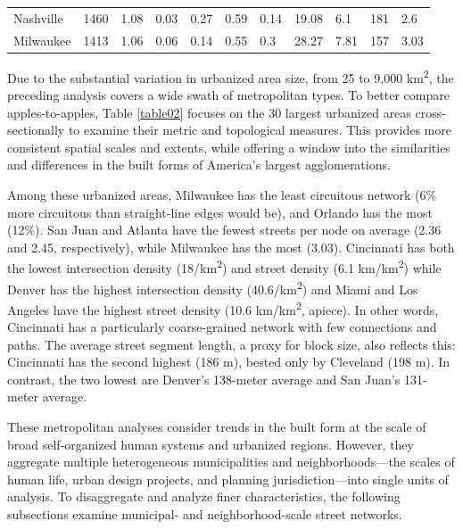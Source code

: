 \documentclass[Afour,sageh,times]{sagej}
\begin{document}
\begin{landscape}
\begin{table}
\begin{tabular}{p{2.5cm} p{1.5cm} p{1.5cm} p{1.5cm} p{1.55cm} p{1.5cm} p{1.5cm} p{1.5cm} p{1.5cm} p{1.5cm} p{1.5cm}}
Nashville            & 1460          & 1.08         & 0.03                       & 0.27           & 0.59        & 0.14        & 19.08                 & 6.1                   & 181                   & 2.6              \\
Milwaukee            & 1413          & 1.06         & 0.06                       & 0.14           & 0.55        & 0.3         & 28.27                 & 7.81                  & 157                   & 3.03 \\
\bottomrule
\end{tabular}
\end{table}
\end{landscape}
\restoregeometry

Due to the substantial variation in urbanized area size, from 25 to 9,000 km\textsuperscript{2}, the preceding analysis covers a wide swath of metropolitan types. To better compare apples-to-apples, Table \ref{table02} focuses on the 30 largest urbanized areas cross-sectionally to examine their metric and topological measures. This provides more consistent spatial scales and extents, while offering a window into the similarities and differences in the built forms of America's largest agglomerations. 

Among these urbanized areas, Milwaukee has the least circuitous network (6\% more circuitous than straight-line edges would be), and Orlando has the most (12\%). San Juan and Atlanta have the fewest streets per node on average (2.36 and 2.45, respectively), while Milwaukee has the most (3.03). Cincinnati has both the lowest intersection density (18/km\textsuperscript{2}) and street density (6.1 km/km\textsuperscript{2}) while Denver has the highest intersection density (40.6/km\textsuperscript{2}) and Miami and Los Angeles have the highest street density (10.6 km/km\textsuperscript{2}, apiece). In other words, Cincinnati has a particularly coarse-grained network with few connections and paths. The average street segment length, a proxy for block size, also reflects this: Cincinnati has the second highest (186 m), bested only by Cleveland (198 m). In contrast, the two lowest are Denver's 138-meter average and San Juan's 131-meter average.

These metropolitan analyses consider trends in the built form at the scale of broad self-organized human systems and urbanized regions. However, they aggregate multiple heterogeneous municipalities and neighborhoods---the scales of human life, urban design projects, and planning jurisdiction---into single units of analysis. To disaggregate and analyze finer characteristics, the following subsections examine municipal- and neighborhood-scale street networks.
\end{document}
